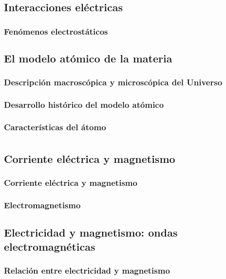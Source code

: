 \documentclass[11pt]{book}
\begin{document}
\section{Interacciones eléctricas}
\subsection{Fenómenos electrostáticos}

\section{El modelo atómico de la materia}
\subsection{Descripción macroscópica y microscópica del Universo}
\subsection{Desarrollo histórico del modelo atómico}
\subsection{Características del átomo}


\chapter{}

\section{Corriente eléctrica y magnetismo}
\subsection{Corriente eléctrica y magnetismo}
\subsection{Electromagnetismo}

\section{Electricidad y magnetismo: ondas electromagnéticas}
\subsection{Relación entre electricidad y magnetismo}
\end{document}
